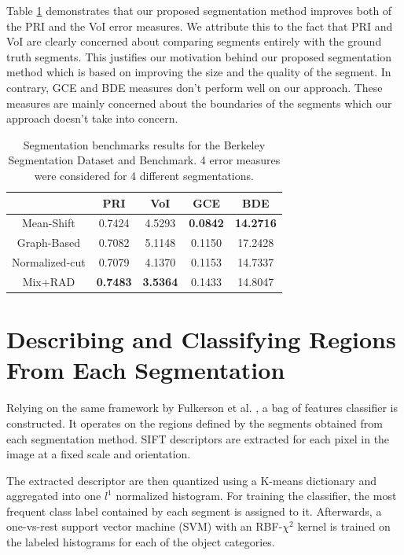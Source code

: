 \documentclass[10pt,twocolumn,letterpaper]{article}
\begin{document}
Table \ref{tab:seg_bench} demonstrates that our proposed segmentation method improves both of the PRI and the VoI error measures.
We attribute this to the fact that  PRI and VoI are clearly concerned about comparing segments entirely with the ground truth segments. 
This justifies our motivation behind our proposed segmentation method which is based on improving the size and the quality of the segment.
In contrary, GCE and BDE measures don't perform well on our approach.
These measures are mainly concerned about the boundaries of the segments which our approach doesn't take into concern.

\begin{table}
\centering
\begin{tabular}
{|c||c|c|c|c|}
\hline
               & PRI             & VoI             & GCE             & BDE              \\\hline
Mean-Shift     & 0.7424          & 4.5293          & \textbf{0.0842} & \textbf{14.2716} \\\hline
Graph-Based    & 0.7082          & 5.1148          & 0.1150          & 17.2428          \\\hline
Normalized-cut & 0.7079          & 4.1370          & 0.1153          & 14.7337          \\\hline
Mix+RAD        & \textbf{0.7483} & \textbf{3.5364} & 0.1433          & 14.8047          \\\hline
\end{tabular}
\caption{Segmentation benchmarks results for the Berkeley Segmentation Dataset and
Benchmark. 4 error measures were considered for 4 different segmentations.}\label{tab:seg_bench}
\end{table}

\section{Describing and Classifying Regions From Each Segmentation}\label{ClassifySegs}

Relying on the same framework by Fulkerson et al. \cite{fulkerson09class}, a bag of features
classifier is constructed. It operates on the regions defined by
the segments obtained from each segmentation method. SIFT descriptors are extracted
for each pixel in the image at a fixed scale and orientation.

The extracted descriptor are then quantized using a K-means dictionary and aggregated
into one $l^1$ normalized histogram. For training the classifier, the most frequent class label
contained by each segment is assigned to it. Afterwards,  a one-vs-rest support vector  machine
(SVM) with an RBF-$\chi^2$ kernel is trained on the labeled histograms for each of the object
categories.
\end{document}
